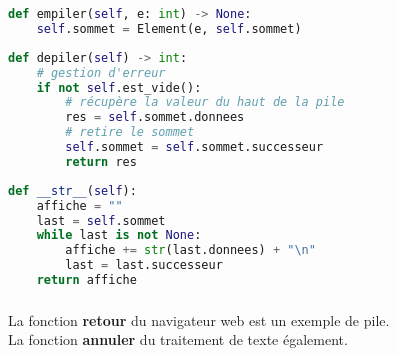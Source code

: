 \documentclass[svgnames,11pt]{beamer}
\begin{document}
\begin{frame}[fragile]

    \begin{lstlisting}[language=Python , basicstyle=\ttfamily\small, xleftmargin=2em, xrightmargin=2em]
def empiler(self, e: int) -> None:
    self.sommet = Element(e, self.sommet)
\end{lstlisting}
\end{frame}
\begin{frame}[fragile]

    \begin{lstlisting}[language=Python , basicstyle=\ttfamily\small, xleftmargin=1em, xrightmargin=1em]
def depiler(self) -> int:
    # gestion d'erreur
    if not self.est_vide():
        # récupère la valeur du haut de la pile
        res = self.sommet.donnees
        # retire le sommet
        self.sommet = self.sommet.successeur
        return res
\end{lstlisting}
\end{frame}
\begin{frame}[fragile]

    \begin{lstlisting}[language=Python , basicstyle=\ttfamily\small, xleftmargin=2em, xrightmargin=2em]
def __str__(self):
    affiche = ""
    last = self.sommet
    while last is not None:
        affiche += str(last.donnees) + "\n"
        last = last.successeur
    return affiche
\end{lstlisting}
\end{frame}
\begin{frame}
    \frametitle{}

    \begin{center}
        La fonction \textbf{retour} du navigateur web est un exemple de pile.\\
        La fonction \textbf{annuler} du traitement de texte également.
    \end{center}

\end{frame}
\end{document}
